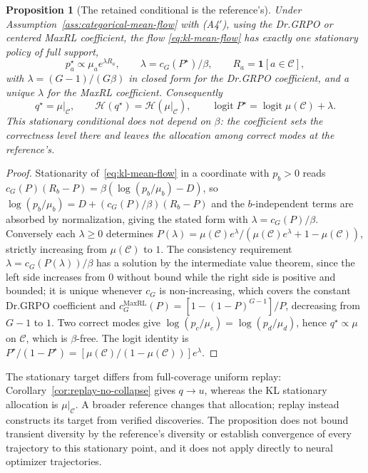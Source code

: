 \documentclass{article}
\newcommand{\enforcehalffinalproseline}{%
  \setlength{\parfillskip}{0pt plus .20\linewidth}}
\newcommand{\1}{\mathbf 1}
\newtheorem{proposition}[lemma]{Proposition}
\theoremstyle{remark}
\theoremstyle{definition}
\theoremstyle{plain}
\begin{document}
\begin{proposition}[The retained conditional is the reference's]
\enforcehalffinalproseline
\label{prop:kl-stationary}
Under Assumption~\ref{ass:categorical-mean-flow} with (A4$'$), using the
Dr.GRPO or centered MaxRL coefficient, the flow
\eqref{eq:kl-mean-flow} has exactly one stationary policy of full support,
\[
  p^\star_a\propto\mu_ae^{\lambda R_a},
  \qquad
  \lambda=c_G(P^\star)/\beta,
  \qquad
  R_a=\1[a\in\mathcal C],
\]
with $\lambda=(G-1)/(G\beta)$ in closed form for the Dr.GRPO coefficient, and
a unique $\lambda$ for the MaxRL coefficient. Consequently
\[
  q^\star=\mu|_{\mathcal C},
  \qquad
  \mathcal H(q^\star)=\mathcal H(\mu|_{\mathcal C}),
  \qquad
  \operatorname{logit}P^\star=\operatorname{logit}\mu(\mathcal C)+\lambda .
\]
This stationary conditional does not depend on $\beta$: the coefficient sets
the correctness level there and leaves the allocation among correct modes at
the reference's.
\end{proposition}

\begin{proof}
\enforcehalffinalproseline
Stationarity of~\eqref{eq:kl-mean-flow} in a coordinate with $p_b>0$ reads
$c_G(P)(R_b-P)=\beta(\log(p_b/\mu_b)-D)$, so
$\log(p_b/\mu_b)=D+(c_G(P)/\beta)(R_b-P)$ and the $b$-independent terms are
absorbed by normalization, giving the stated form with $\lambda=c_G(P)/\beta$.
Conversely each $\lambda\ge0$ determines
$P(\lambda)=\mu(\mathcal C)e^\lambda/(\mu(\mathcal C)e^\lambda+1-\mu(\mathcal C))$,
strictly increasing from $\mu(\mathcal C)$ to $1$. The consistency requirement
$\lambda=c_G(P(\lambda))/\beta$ has a solution by the intermediate value
theorem, since the left side increases from $0$ without bound while the right
side is positive and bounded; it is unique whenever $c_G$ is non-increasing,
which covers the constant Dr.GRPO coefficient and
$c_G^{\mathrm{MaxRL}}(P)=[1-(1-P)^{G-1}]/P$, decreasing from $G-1$ to $1$.
Two correct modes give $\log(p_c/\mu_c)=\log(p_d/\mu_d)$, hence
$q^\star\propto\mu$ on $\mathcal C$, which is $\beta$-free. The logit identity
is $P^\star/(1-P^\star)=[\mu(\mathcal C)/(1-\mu(\mathcal C))]e^\lambda$.
\end{proof}

The stationary target differs from full-coverage uniform replay:
Corollary~\ref{cor:replay-no-collapse} gives $q\to u$, whereas the KL
stationary allocation is $\mu|_{\mathcal C}$. A broader reference changes that
allocation; replay instead constructs its target from verified discoveries.
The proposition does not bound transient diversity by the reference's
diversity or establish convergence of every trajectory to this stationary
point, and it does not apply directly to neural optimizer trajectories.
\end{document}
